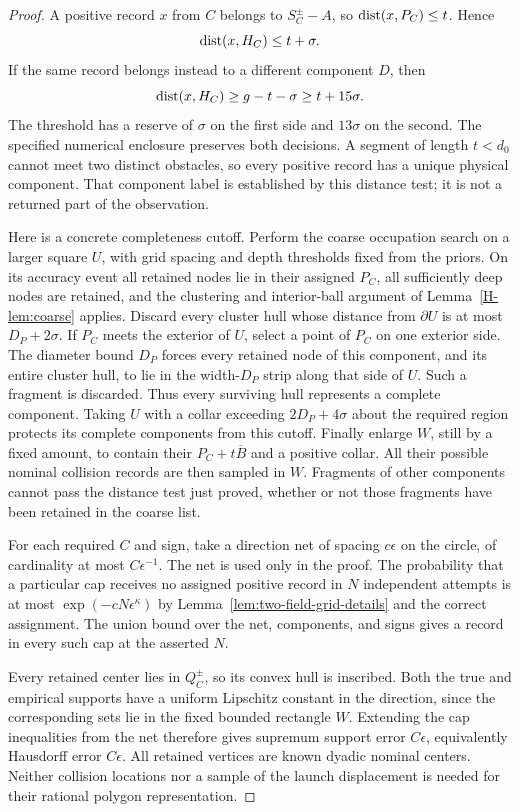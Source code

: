 \begin{proof}
A positive record $x$ from $C$ belongs to $S_C^\pm-A$, so
$\operatorname{dist}(x,P_C)\le t$.  Hence
\[
 \operatorname{dist}(x,H_C)\le t+\sigma.
\]
If the same record belongs instead to a different component $D$,
then
\[
 \operatorname{dist}(x,H_C)\ge g-t-\sigma
       \ge t+15\sigma.
\]
The threshold has a reserve of $\sigma$ on the first side and
$13\sigma$ on the second.  The specified numerical enclosure
preserves both decisions.  A segment of length $t<d_0$ cannot
meet two distinct obstacles, so every positive record has a unique
physical component.  That component label is established by this
distance test; it is not a returned part of the observation.

Here is a concrete completeness cutoff.  Perform the coarse
occupation search on a larger square $U$, with grid spacing and
depth thresholds fixed from the priors.  On its accuracy event all
retained nodes lie in their assigned $P_C$, all sufficiently deep
nodes are retained, and the clustering and interior-ball argument
of Lemma~\ref{H-lem:coarse} applies.  Discard every cluster hull
whose distance from $\partial U$ is at most $D_P+2\sigma$.
If $P_C$ meets the exterior of $U$, select a point of $P_C$ on
one exterior side.  The diameter bound $D_P$ forces every retained
node of this component, and its entire cluster hull, to lie in the
width-$D_P$ strip along that side of $U$.  Such a fragment is
discarded.  Thus every surviving hull represents a complete
component.  Taking $U$ with a collar exceeding $2D_P+4\sigma$
about the required region protects its complete components from
this cutoff.  Finally enlarge $W$, still by a fixed amount, to
contain their $P_C+t\overline B$ and a positive collar.  All
their possible nominal collision records are then sampled in
$W$.  Fragments of other components cannot pass the distance
test just proved, whether or not those fragments have been
retained in the coarse list.

For each required $C$ and sign, take a direction net of spacing
$c\epsilon$ on the circle, of cardinality at most
$C\epsilon^{-1}$.  The net is used only in the proof.  The
probability that a particular cap receives no assigned positive
record in $N$ independent attempts is at most
$\exp(-cN\epsilon^\kappa)$ by
Lemma~\ref{lem:two-field-grid-details} and the correct assignment.
The union bound over the net, components, and signs gives a record
in every such cap at the asserted $N$.

Every retained center lies in $Q_C^\pm$, so its convex hull is
inscribed.  Both the true and empirical supports have a uniform
Lipschitz constant in the direction, since the corresponding sets
lie in the fixed bounded rectangle $W$.  Extending the cap
inequalities from the net therefore gives supremum support error
$C\epsilon$, equivalently Hausdorff error $C\epsilon$.
All retained vertices are known dyadic nominal centers.  Neither
collision locations nor a sample of the launch displacement is
needed for their rational polygon representation.
\end{proof}


